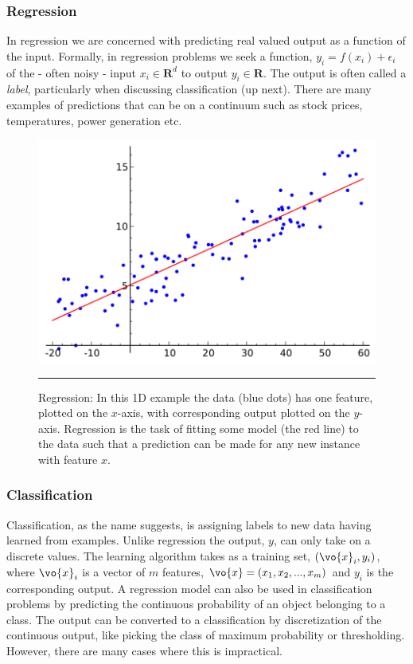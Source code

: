         \subsubsection{Regression}
 
In regression we are concerned with predicting real valued output as a function of the input.
Formally, in regression problems we seek a function, $y_i = f(x_i)+\epsilon_i$ of the - often noisy - input $x_i \in \mathbf{R}^d$ to output $y_i \in \mathbf{R}$\citep{sammut2011encyclopedia}. 
The output is often called a \textit{label}, particularly when discussing classification (up next)\citep{barber2012bayesian}.
There are many examples of predictions that can be on a continuum such as stock prices, temperatures, power generation etc.

\begin{figure}[htbp]
	\centering
		\includegraphics{./Figures/regression.png}
		\rule{35em}{0.5pt}
	\caption[Regression]{Regression: In this 1D example the data (blue dots) has one feature, plotted on the $x$-axis, with corresponding output plotted on the $y$-axis. Regression is the task of fitting some model (the red line) to the data such that a prediction can be made for any new instance with feature $x$.}
	\label{fig:regression}
\end{figure}

		\subsubsection{Classification}

Classification, as the name suggests, is assigning labels to new data having learned from examples.
Unlike regression the output, ${y}$, can only take on a discrete values.
The learning algorithm takes as a training set, $(\vo{x}_i,y_i)$, where $\vo{x}_i$ is a vector of $m$ features, $\vo{x} = (x_1, x_2, ..., x_m)$ and $y_i$ is the corresponding output\citep{domingos2012few}.
A regression model can also be used in classification problems by predicting the continuous probability of an object belonging to a class.
The output can be converted to a classification by discretization of the continuous output, like picking the class of maximum probability or thresholding.
However, there are many cases where this is impractical\citep{barber2012bayesian}.

